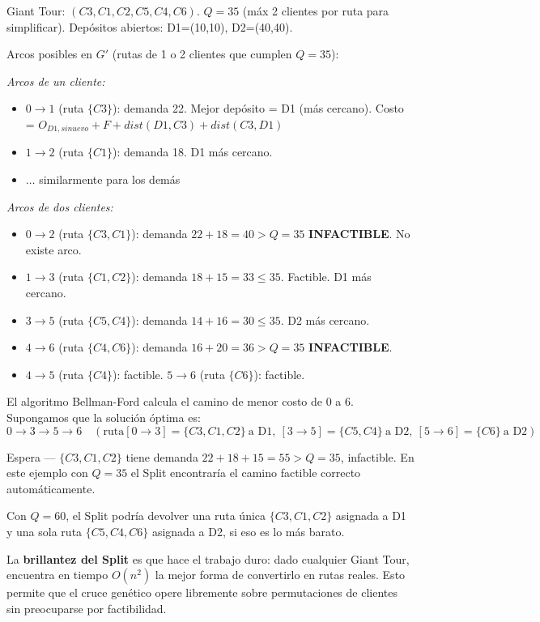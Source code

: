 \documentclass[12pt,a4paper]{article}
\begin{document}
\begin{ejemplo}
Giant Tour: $(C3, C1, C2, C5, C4, C6)$. $Q=35$ (máx 2 clientes por ruta para simplificar). Depósitos abiertos: D1=(10,10), D2=(40,40).

Arcos posibles en $G'$ (rutas de 1 o 2 clientes que cumplen $Q=35$):

\textit{Arcos de un cliente:}
\begin{itemize}
\item $0 \to 1$ (ruta $\{C3\}$): demanda 22. Mejor depósito = D1 (más cercano). Costo = $O_{D1,si nuevo} + F + dist(D1,C3) + dist(C3,D1)$
\item $1 \to 2$ (ruta $\{C1\}$): demanda 18. D1 más cercano.
\item $\ldots$ similarmente para los demás
\end{itemize}

\textit{Arcos de dos clientes:}
\begin{itemize}
\item $0 \to 2$ (ruta $\{C3, C1\}$): demanda $22+18=40 > Q=35$ \textrightarrow{} \textbf{INFACTIBLE}. No existe arco.
\item $1 \to 3$ (ruta $\{C1, C2\}$): demanda $18+15=33 \leq 35$. Factible. D1 más cercano.
\item $3 \to 5$ (ruta $\{C5, C4\}$): demanda $14+16=30 \leq 35$. D2 más cercano.
\item $4 \to 6$ (ruta $\{C4, C6\}$): demanda $16+20=36 > Q=35$ \textrightarrow{} \textbf{INFACTIBLE}.
\item $4 \to 5$ (ruta $\{C4\}$): factible. \quad $5 \to 6$ (ruta $\{C6\}$): factible.
\end{itemize}

El algoritmo Bellman-Ford calcula el camino de menor costo de $0$ a $6$. Supongamos que la solución óptima es:
$$0 \to 3 \to 5 \to 6 \quad (\text{ruta}[0\to3]=\{C3,C1,C2\}\ \text{a D1},\ [3\to5]=\{C5,C4\}\ \text{a D2},\ [5\to6]=\{C6\}\ \text{a D2})$$

Espera --- $\{C3, C1, C2\}$ tiene demanda $22+18+15=55 > Q=35$, infactible. En este ejemplo con $Q=35$ el Split encontraría el camino factible correcto automáticamente.

Con $Q=60$, el Split podría devolver una ruta única $\{C3,C1,C2\}$ asignada a D1 y una sola ruta $\{C5,C4,C6\}$ asignada a D2, si eso es lo más barato.
\end{ejemplo}

\begin{nota}
La \textbf{brillantez del Split} es que hace el trabajo duro: dado cualquier Giant Tour, encuentra en tiempo $O(n^2)$ la mejor forma de convertirlo en rutas reales. Esto permite que el cruce genético opere libremente sobre permutaciones de clientes sin preocuparse por factibilidad.
\end{nota}
\end{document}
